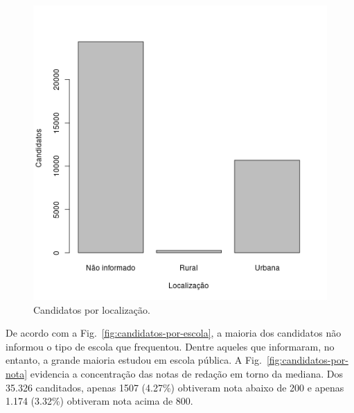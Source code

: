\documentclass[12pt]{article}
\newcommand{\reffig}[1]{Fig.~\ref{fig:#1}}
\begin{document}
\begin{minipage}{.5\textwidth}
    \begin{figure}[H]
    \includegraphics[width=\linewidth]{../geral_candidatos-por-localizacao.png}
    \caption{Candidatos por localização.}
    \label{fig:candidatos-por-localizacao}
    \end{figure}
\end{minipage}


\vspace{1cm}
De acordo com a \reffig{candidatos-por-escola}, a maioria dos candidatos não informou o tipo de escola que frequentou.
Dentre aqueles que informaram, no entanto, a grande maioria estudou em escola pública.
A \reffig{candidatos-por-nota} evidencia a concentração das notas de redação em torno da mediana.
Dos 35.326 canditados, apenas 1507 (4.27\%) obtiveram nota abaixo de 200 e apenas 1.174 (3.32\%) obtiveram nota acima de 800.
\end{document}
